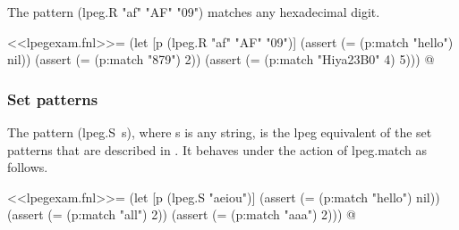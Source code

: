 \documentclass{article}
\begin{document}
The pattern \textsf{(lpeg.R "af" "AF" "09")} matches any hexadecimal
digit.
\begin{codechunk}
<<lpegexam.fnl>>=
(let [p (lpeg.R "af" "AF" "09")]
  (assert (= (p:match "hello") nil))
  (assert (= (p:match "879") 2))
  (assert (= (p:match "Hiya23B0" 4) 5)))
@
\end{codechunk}

\subsubsection{Set patterns}
\label{sec:sghktf56}

The pattern \textsf{(lpeg.S~s)}, where \textsf{s} is any string, is
the \textsf{lpeg} equivalent of the set patterns that are described in
.  It behaves under the action of
\textsf{lpeg.match} as follows.
\begin{codechunk}
<<lpegexam.fnl>>=
(let [p (lpeg.S "aeiou")]
  (assert (= (p:match "hello") nil))
  (assert (= (p:match "all") 2))
  (assert (= (p:match "aaa") 2)))
@
\end{codechunk}

\bibsection

\nowebchunkssection

\nowebindexsection
\end{document}
